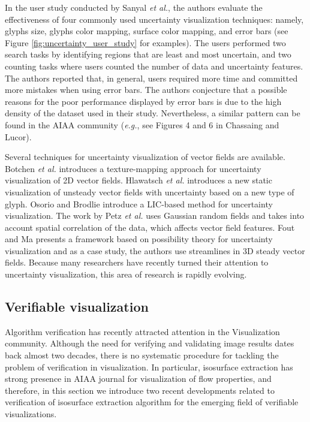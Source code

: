 In the user study conducted by Sanyal \emph{et al.}\cite{Sanyal:2009:USC:1638611.1639227},  the authors evaluate the effectiveness of four commonly used uncertainty visualization techniques: namely, glyphs size, glyphs color mapping, surface color mapping, and error bars (see Figure \ref{fig:uncertainty_user_study} for examples). The users performed two search tasks by identifying regions that are least and most uncertain, and two counting tasks where users counted the number of data and uncertainty features. The authors reported that, in general,  users required more time and committed more mistakes when using error bars. The authors conjecture that a possible reasons for the poor performance displayed by error bars is due to the high density of the dataset used in their study. Nevertheless, a similar pattern can be found in the AIAA community (\emph{e.g.}, see Figures 4 and 6 in Chassaing and Lucor\cite{Chassaing:2010:SIF:27267063}). 

Several techniques for uncertainty visualization of vector fields are available. Botchen \emph{et al.}\cite{10.1109/VIS.2005.97} introduces a texture-mapping approach  for uncertainty visualization of 2D vector fields. Hlawatsch \emph{et al.}\cite{hlawatsch:2011:FRGU} introduces a new static visualization of unsteady vector fields with uncertainty based on a new type of glyph. Osorio and Brodlie\cite{allendes2009uncertain} introduce a LIC-based method for uncertainty visualization. The work by Petz \emph{et al.}\cite{CGF:CGF3097} uses Gaussian random fields and takes into account spatial correlation of the data, which affects vector field features. Fout and Ma\cite{Fout2012} presents a framework based on possibility theory for uncertainty visualization and as a case study, the authors use streamlines in 3D steady vector fields.  Because many researchers have recently turned their attention to uncertainty visualization, this area of research is rapidly evolving.

\subsection{Verifiable visualization}

Algorithm verification has recently attracted attention in the Visualization community.
Although the need for verifying and validating image results dates back almost two decades,
there is no systematic procedure for tackling the problem of verification in visualization.
In particular, isosurface extraction has strong presence in AIAA journal for visualization of
flow properties, and therefore, in this section we introduce two recent developments related to verification of isosurface extraction
algorithm for the emerging field of verifiable visualizations.

